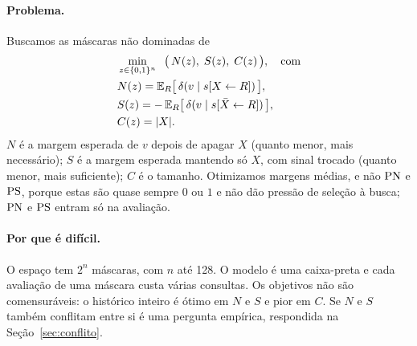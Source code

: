 \paragraph{Problema.}
Buscamos as máscaras não dominadas de
\begin{equation}
\begin{aligned}
  &\min_{z \in \{0,1\}^n} \;\; \big(\, N(z),\; S(z),\; C(z) \,\big), \quad \text{com}\\
  &N(z) = \mathbb{E}_{R}\big[\,\delta(v \mid s[X \leftarrow R])\,\big],\\
  &S(z) = -\,\mathbb{E}_{R}\big[\,\delta(v \mid s[\bar X \leftarrow R])\,\big],\\
  &C(z) = |X|.
\end{aligned}
\label{eq:problema}
\end{equation}
$N$ é a margem esperada de $v$ depois de apagar $X$ (quanto menor, mais
necessário); $S$ é a margem esperada mantendo só $X$, com sinal trocado (quanto
menor, mais suficiente); $C$ é o tamanho. Otimizamos margens médias, e não
$\mathrm{PN}$ e $\mathrm{PS}$, porque estas são quase sempre $0$ ou $1$ e não dão pressão de
seleção à busca; $\mathrm{PN}$ e $\mathrm{PS}$ entram só na avaliação.

\paragraph{Por que é difícil.}
O espaço tem $2^n$ máscaras, com $n$ até 128. O modelo é uma caixa-preta e
cada avaliação de uma máscara custa várias consultas. Os objetivos não são
comensuráveis: o histórico inteiro é ótimo em $N$ e $S$ e pior em $C$. Se $N$
e $S$ também conflitam entre si é uma pergunta empírica, respondida na
Seção~\ref{sec:conflito}.
